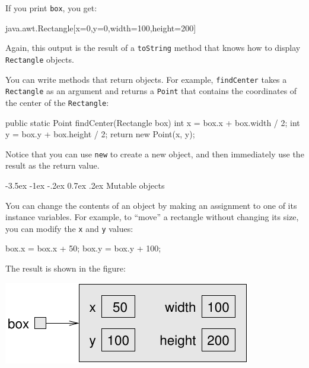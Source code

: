 \documentclass[12pt]{book}
\makeatletter
\theoremstyle{exercise}
\newcommand{\java}[1]{\verb"#1"}
\renewcommand{\section}{\@startsection {section}{1}{\z@}%
    {-3.5ex \@plus -1ex \@minus -.2ex}%
    {0.7ex \@plus.2ex}%
    {\normalfont\Large\bfseries}}
\newcommand{\java}[1]{\lstinline{#1}} %
\makeatother
\begin{document}
If you print \java{box}, you get:

\begin{stdout}
java.awt.Rectangle[x=0,y=0,width=100,height=200]
\end{stdout}

Again, this output is the result of a \java{toString} method that knows how to display \java{Rectangle} objects.


You can write methods that return objects.
For example, \java{findCenter} takes a \java{Rectangle} as an argument and returns a \java{Point} that contains the coordinates of the center of the \java{Rectangle}:

\begin{code}
    public static Point findCenter(Rectangle box) {
        int x = box.x + box.width / 2;
        int y = box.y + box.height / 2;
        return new Point(x, y);
    }
\end{code}

Notice that you can use \java{new} to create a new object, and then immediately use the result as the return value.


\section{Mutable objects}


You can change the contents of an object by making an assignment to one of its instance variables.
For example, to ``move'' a rectangle without changing its size, you can modify the \java{x} and \java{y} values:

\begin{code}
    box.x = box.x + 50;
    box.y = box.y + 100;
\end{code}

The result is shown in the figure:

\begin{center}
\includegraphics{figs/rectangle2.pdf}
\end{center}
\end{document}
